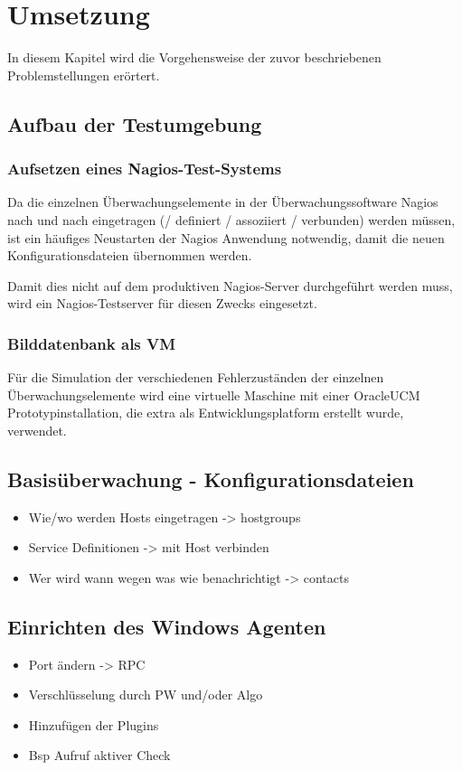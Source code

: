 \section{Umsetzung}
In diesem Kapitel wird die Vorgehensweise der zuvor beschriebenen Problemstellungen erörtert.

\subsection{Aufbau der Testumgebung}




\subsubsection{Aufsetzen eines Nagios-Test-Systems}
Da die einzelnen Überwachungselemente in der Überwachungssoftware Nagios nach und nach eingetragen (/ definiert / assoziiert / verbunden) werden müssen, ist ein häufiges Neustarten der Nagios Anwendung notwendig, damit die neuen Konfigurationsdateien übernommen werden.

Damit dies nicht auf dem produktiven Nagios-Server durchgeführt werden muss, wird ein Nagios-Testserver für diesen Zwecks eingesetzt.

\subsubsection{Bilddatenbank als VM}
Für die Simulation der verschiedenen Fehlerzuständen der einzelnen Überwachungselemente wird eine virtuelle Maschine mit einer \gls{OracleUCM} Prototypinstallation, die extra als Entwicklungsplatform erstellt wurde, verwendet.


\subsection{Basisüberwachung - Konfigurationsdateien}
\begin{itemize}
\item Wie/wo werden Hosts eingetragen -> hostgroups
\item Service Definitionen -> mit Host verbinden
\item Wer wird wann wegen was wie benachrichtigt -> contacts
\end{itemize}

\subsection{Einrichten des Windows Agenten}
\begin{itemize}
\item Port ändern -> RPC
\item Verschlüsselung durch PW und/oder Algo
\item Hinzufügen der Plugins
\item Bsp Aufruf aktiver Check
\end{itemize}

